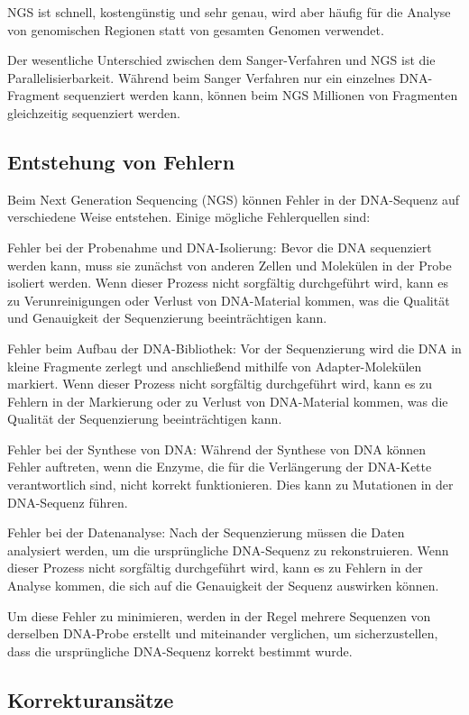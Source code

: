 \documentclass[oneside,bibliography=totocnumbered,BCOR=5mm]{scrbook}%
\theoremstyle{definition}
\theoremstyle{definition}
\theoremstyle{definition}
\theoremstyle{definition}
\theoremstyle{definition}
\theoremstyle{definition}
\begin{document}
NGS ist schnell, kostengünstig und sehr genau, 
wird aber häufig für die Analyse von genomischen Regionen statt von gesamten Genomen verwendet.


Der wesentliche Unterschied zwischen dem Sanger-Verfahren und NGS ist die Parallelisierbarkeit. 
Während beim Sanger Verfahren nur ein einzelnes DNA-Fragment sequenziert werden kann, 
können beim NGS Millionen von Fragmenten gleichzeitig sequenziert werden.


\subsection{Entstehung von Fehlern}


Beim Next Generation Sequencing (NGS) können Fehler in der DNA-Sequenz auf verschiedene Weise entstehen. 
Einige mögliche Fehlerquellen sind:


Fehler bei der Probenahme und DNA-Isolierung: Bevor die DNA sequenziert werden kann, 
muss sie zunächst von anderen Zellen und Molekülen in der Probe isoliert werden. 
Wenn dieser Prozess nicht sorgfältig durchgeführt wird, kann es zu Verunreinigungen oder Verlust von 
DNA-Material kommen, was die Qualität und Genauigkeit der Sequenzierung beeinträchtigen kann.


Fehler beim Aufbau der DNA-Bibliothek: Vor der Sequenzierung wird die DNA in kleine Fragmente zerlegt und 
anschließend mithilfe von Adapter-Molekülen markiert. Wenn dieser Prozess nicht sorgfältig durchgeführt wird, 
kann es zu Fehlern in der Markierung oder zu Verlust von DNA-Material kommen, 
was die Qualität der Sequenzierung beeinträchtigen kann.


Fehler bei der Synthese von DNA: Während der Synthese von DNA können Fehler auftreten, 
wenn die Enzyme, die für die Verlängerung der DNA-Kette verantwortlich sind, nicht korrekt funktionieren. 
Dies kann zu Mutationen in der DNA-Sequenz führen.


Fehler bei der Datenanalyse: Nach der Sequenzierung müssen die Daten analysiert werden, 
um die ursprüngliche DNA-Sequenz zu rekonstruieren. Wenn dieser Prozess nicht sorgfältig durchgeführt wird, 
kann es zu Fehlern in der Analyse kommen, die sich auf die Genauigkeit der Sequenz auswirken können.


Um diese Fehler zu minimieren, werden in der Regel mehrere Sequenzen von derselben DNA-Probe erstellt und miteinander verglichen, 
um sicherzustellen, dass die ursprüngliche DNA-Sequenz korrekt bestimmt wurde.


\subsection{Korrekturansätze}
\end{document}
